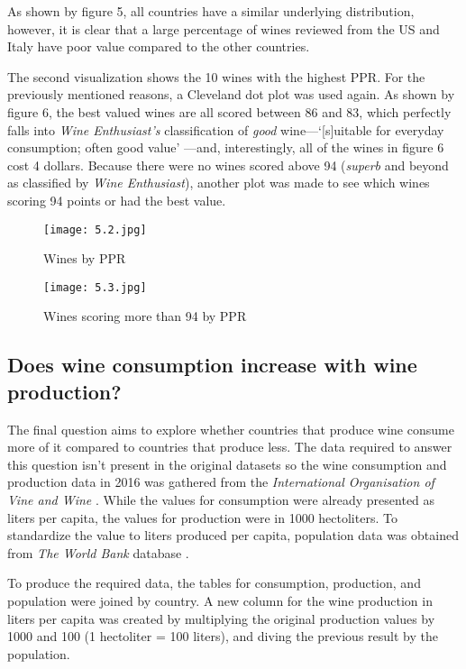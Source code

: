 As shown by figure 5, all countries have a similar underlying distribution, however, it is clear that a large percentage of wines reviewed from the US and Italy have poor value compared to the other countries.

The second visualization shows the 10 wines with the highest PPR. For the previously mentioned reasons, a Cleveland dot plot was used again. As shown by figure 6, the best valued wines are all scored between 86 and 83, which perfectly falls into \emph{Wine Enthusiast's} classification of \emph{good} wine---`[s]uitable for everyday consumption; often good value' \cite{WineMag}---and, interestingly, all of the wines in figure 6 cost 4 dollars. Because there were no wines scored above 94 (\emph{superb} and beyond as classified by \emph{Wine Enthusiast}), another plot was made to see which wines scoring 94 points or had the best value.

\begin{figure}[h]
  \texttt{[image: 5.2.jpg]}
  \caption{Wines by PPR}
\end{figure}

\begin{figure}[h]
  \texttt{[image: 5.3.jpg]}
  \caption{Wines scoring more than 94 by PPR}
\end{figure}

\subsection{Does wine consumption increase with wine production?}

The final question aims to explore whether countries that produce wine consume more of it compared to countries that produce less. The data required to answer this question isn't present in the original datasets so the wine consumption and production data in 2016 was gathered from the \emph{International Organisation of Vine and Wine} \cite{OIV}. While the values for consumption were already presented as liters per capita, the values for production were in 1000 hectoliters. To standardize the value to liters produced per capita, population data was obtained from \emph{The World Bank} database \cite{WorldBank}.

To produce the required data, the tables for consumption, production, and population were joined by country. A new column for the wine production in liters per capita was created by multiplying the original production values by 1000 and 100 (1 hectoliter = 100 liters), and diving the previous result by the population.

